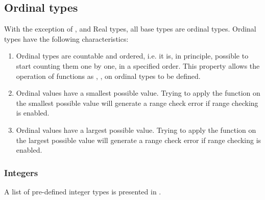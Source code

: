 \subsection{Ordinal types}
With the exception of ,  and Real types, 
all base types are ordinal types. Ordinal types have the following 
characteristics:
\begin{enumerate}
\item Ordinal types are countable and ordered, i.e. it is, in principle,
possible to start counting them one by one, in a specified order.
This property allows the operation of functions as , ,
on ordinal types to be defined.
\item Ordinal values have a smallest possible value. Trying to apply the
 function on the smallest possible value will generate a range
check error if range checking is enabled.
\item Ordinal values have a largest possible value. Trying to apply the
 function on the largest possible value will generate a range
check error if range checking is enabled.
\end{enumerate}
\subsubsection{Integers}
A list of pre-defined integer types is presented in .

    
   
   
	 
   
    
   

